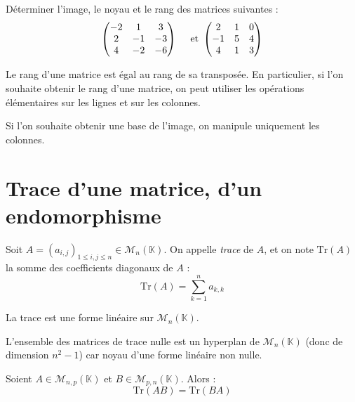 \documentclass[a4paper,10pt]{report}
\begin{document}
\begin{exa} Déterminer l'image, le noyau et le rang des matrices suivantes :
$$ \begin{pmatrix}
-2 & 1 & 3 \\
2 & -1 & -3 \\
4 & -2 & -6 \\
\end{pmatrix} \quad \hbox{ et } \begin{pmatrix}
2 & 1 & 0 \\
-1 & 5 & 4 \\
4 & 1 & 3 \\
\end{pmatrix} $$
\end{exa}

\begin{thm} Le rang d'une matrice est égal au rang de sa transposée. 
\noindent En particulier, si l'on souhaite obtenir le rang d'une matrice, on peut utiliser les opérations élémentaires sur les lignes et sur les colonnes. 
\end{thm}

\begin{att} Si l'on souhaite obtenir une base de l'image, on manipule uniquement les colonnes.
\end{att}
\section{Trace d'une matrice, d'un endomorphisme}

\begin{defin} Soit $A=(a_{i,j})_{1 \leq i,j \leq n} \in \mathcal{M}_n(\mathbb{K})$. On appelle \textit{trace} de $A$, et on note $\textrm{Tr}(A)$ la somme des coefficients diagonaux de $A$ :
$$\textrm{Tr}(A) = \sum_{k=1}^n a_{k,k}$$
\end{defin}

\begin{prop} La trace est une forme linéaire sur $\mathcal{M}_n( \mathbb{K})$.
\end{prop}

\begin{ex} L'ensemble des matrices de trace nulle est un hyperplan de $\mathcal{M}_n(\mathbb{K})$ (donc de dimension $n^2-1$) car noyau d'une forme linéaire non nulle.
\end{ex}

\begin{prop} Soient $A \in \mathcal{M}_{n,p}(\mathbb{K})$ et $B \in \mathcal{M}_{p,n}(\mathbb{K})$. Alors :
$$ \textrm{Tr}(AB) = \textrm{Tr}(BA) $$
\end{prop}
\end{document}
